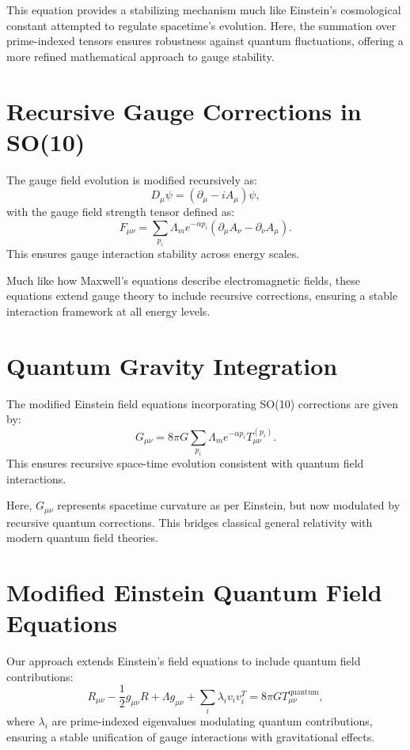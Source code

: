\documentclass{article}
\begin{document}
This equation provides a stabilizing mechanism much like Einstein’s cosmological constant attempted to regulate spacetime’s evolution. Here, the summation over prime-indexed tensors ensures robustness against quantum fluctuations, offering a more refined mathematical approach to gauge stability.

\section{Recursive Gauge Corrections in SO(10)}
The gauge field evolution is modified recursively as:
\begin{equation}
    D_{\mu} \psi = (\partial_{\mu} - i A_{\mu}) \psi,
\end{equation}
with the gauge field strength tensor defined as:
\begin{equation}
    F_{\mu\nu} = \sum_{p_i} \Lambda_m e^{-\alpha p_i} (\partial_{\mu} A_{\nu} - \partial_{\nu} A_{\mu}).
\end{equation}
This ensures gauge interaction stability across energy scales.

Much like how Maxwell's equations describe electromagnetic fields, these equations extend gauge theory to include recursive corrections, ensuring a stable interaction framework at all energy levels.

\section{Quantum Gravity Integration}
The modified Einstein field equations incorporating SO(10) corrections are given by:
\begin{equation}
    G_{\mu\nu} = 8\pi G \sum_{p_i} \Lambda_m e^{-\alpha p_i} T_{\mu\nu}^{(p_i)}.
\end{equation}
This ensures recursive space-time evolution consistent with quantum field interactions.

Here, $G_{\mu\nu}$ represents spacetime curvature as per Einstein, but now modulated by recursive quantum corrections. This bridges classical general relativity with modern quantum field theories.

\section{Modified Einstein Quantum Field Equations}
Our approach extends Einstein’s field equations to include quantum field contributions:
\begin{equation}
    R_{\mu\nu} - \frac{1}{2} g_{\mu\nu} R + \Lambda g_{\mu\nu} + \sum_{i} \lambda_i v_i v_i^T = 8\pi G T_{\mu\nu}^{\text{quantum}},
\end{equation}
where $\lambda_i$ are prime-indexed eigenvalues modulating quantum contributions, ensuring a stable unification of gauge interactions with gravitational effects.
\end{document}
